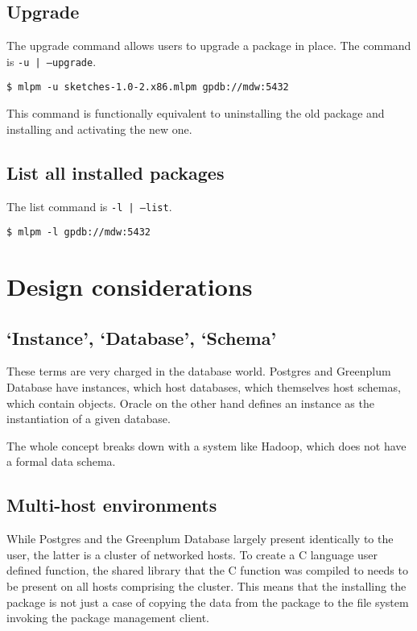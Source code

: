 \documentclass[11pt]{article}
\begin{document}
{	\subsection{Upgrade}

		The upgrade command allows users to upgrade a package in place. The
		command is \texttt{-u | --upgrade}.

		\begin{lstlisting}
$ mlpm -u sketches-1.0-2.x86.mlpm gpdb://mdw:5432
		\end{lstlisting}

		This command is functionally equivalent to uninstalling the old package
		and installing and activating the new one.

	\subsection{List all installed packages}

		The list command is \texttt{-l | --list}.

		\begin{lstlisting}
$ mlpm -l gpdb://mdw:5432
		\end{lstlisting}

\ifx\pdfoutput\undefined %
\else
{}
\fi

\section{Design considerations}
	
	\subsection{`Instance', `Database', `Schema'}

	These terms are very charged in the database world. Postgres and Greenplum
	Database have instances, which host databases, which themselves host
	schemas, which contain objects. Oracle on the other hand defines an instance
	as the instantiation of a given database.

	The whole concept breaks down with a system like Hadoop, which does not have
	a formal data schema.

	\subsection{Multi-host environments}

	While Postgres and the Greenplum Database largely present identically to the
	user, the latter is a cluster of networked hosts. To create a C language
	user defined function, the shared library that the C function was compiled
	to needs to be present on all hosts comprising the cluster. This means that
	the installing the package is not just a case of copying the data from the
	package to the file system invoking the package management client.

}
\end{document}
